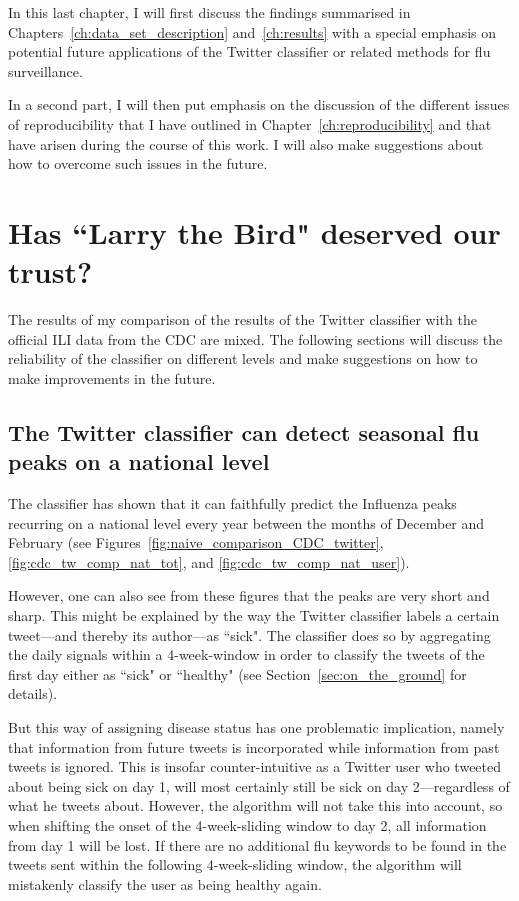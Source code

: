 \documentclass[11pt, a4paper,twoside]{report}\usepackage[]{graphicx}\usepackage[]{color}
\begin{document}
In this last chapter, I will first discuss the findings summarised in Chapters~\ref{ch:data_set_description} and~\ref{ch:results} with a special emphasis on potential future applications of the Twitter classifier or related methods for flu surveillance.

In a second part, I will then put emphasis on the discussion of the different issues of reproducibility that I have outlined in Chapter~\ref{ch:reproducibility} and that have arisen during the course of this work. I will also make suggestions about how to overcome such issues in the future. 

\section{Has ``Larry the Bird" deserved our trust?}
\label{sec:disc_data_set}

The results of my comparison of the results of the Twitter classifier with the official ILI data from the CDC are mixed. The following sections will discuss the reliability of the classifier on different levels and make suggestions on how to make improvements in the future.

\subsection{The Twitter classifier can detect seasonal flu peaks on a national level}
The classifier has shown that it can faithfully predict the Influenza peaks recurring on a national level every year between the months of December and February (see Figures~\ref{fig:naive_comparison_CDC_twitter}, \ref{fig:cdc_tw_comp_nat_tot}, and \ref{fig:cdc_tw_comp_nat_user}). 

However, one can also see from these figures that the peaks are very short and sharp. This might be explained by the way the Twitter classifier labels a certain tweet---and thereby its author---as ``sick". The classifier does so by aggregating the daily signals within a 4-week-window in order to classify the tweets of the first day either as ``sick" or ``healthy" (see Section~\ref{sec:on_the_ground} for details). 

But this way of assigning disease status has one problematic implication, namely that information from future tweets is incorporated while information from past tweets is ignored. This is insofar counter-intuitive as a Twitter user who tweeted about being sick on day 1, will most certainly still be sick on day 2---regardless of what he tweets about. However, the algorithm will not take this into account, so when shifting the onset of the 4-week-sliding window to day 2, all information from day 1 will be lost. If there are no additional flu keywords to be found in the tweets sent within the following 4-week-sliding window, the algorithm will mistakenly classify the user as being healthy again.
\end{document}
